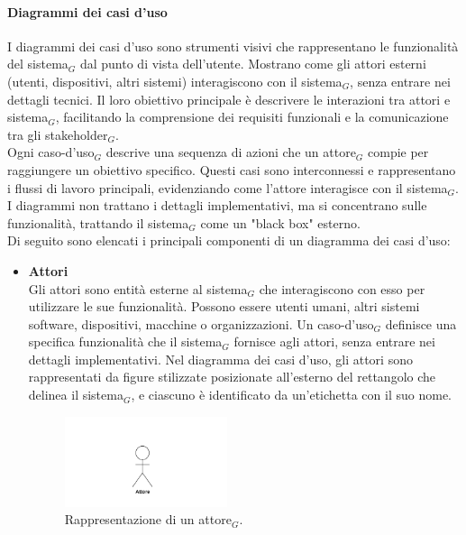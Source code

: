 \documentclass[10pt]{article}
\begin{document}
\begin{justify}
        \paragraph{Diagrammi dei casi d'uso}
        I diagrammi dei casi d'uso sono strumenti visivi che rappresentano le funzionalità del sistema$_G$ dal punto di vista dell'utente. Mostrano come gli attori esterni (utenti, dispositivi, altri sistemi) interagiscono con il sistema$_G$, senza entrare nei dettagli tecnici. Il loro obiettivo principale è descrivere le interazioni tra attori e sistema$_G$, facilitando la comprensione dei requisiti funzionali e la comunicazione tra gli stakeholder$_G$.\\
        Ogni caso-d'uso$_G$ descrive una sequenza di azioni che un attore$_G$ compie per raggiungere un obiettivo specifico. Questi casi sono interconnessi e rappresentano i flussi di lavoro principali, evidenziando come l'attore interagisce con il sistema$_G$. I diagrammi non trattano i dettagli implementativi, ma si concentrano sulle funzionalità, trattando il sistema$_G$ come un "black box" esterno.\\
        Di seguito sono elencati i principali componenti di un diagramma dei casi d'uso:
        \begin{itemize}
            \item \textbf{Attori}\\
            Gli attori sono entità esterne al sistema$_G$ che interagiscono con esso per utilizzare le sue funzionalità. Possono essere utenti umani, altri sistemi software, dispositivi, macchine o organizzazioni. Un caso-d'uso$_G$ definisce una specifica funzionalità che il sistema$_G$ fornisce agli attori, senza entrare nei dettagli implementativi. Nel diagramma dei casi d'uso, gli attori sono rappresentati da figure stilizzate posizionate all'esterno del rettangolo che delinea il sistema$_G$, e ciascuno è identificato da un'etichetta con il suo nome.
            \begin{figure}[H]
            \centering
            \includegraphics[width=0.45\textwidth]{Attore.PNG}
            \caption{Rappresentazione di un attore$_G$.}
            \end{figure}


\end{itemize}
\end{justify}
\end{document}
